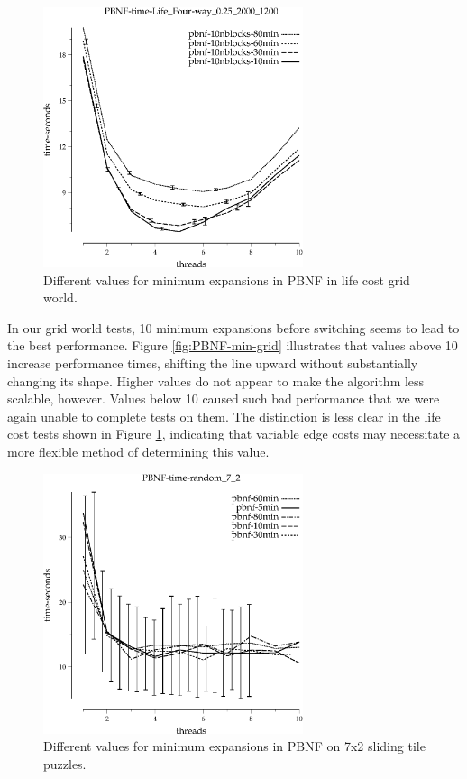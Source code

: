 \documentclass{article}
\begin{document}
\begin{figure}[h!]
\includegraphics[width=3in]{../graphs/grid_life_four-way_0.25_2000_1200/PBNF-time-Life_Four-way_0.25_2000_1200.eps}
\caption{Different values for minimum expansions in PBNF in life cost grid world.}
\label{fig:PBNF-min-life}
\end{figure}

In our grid world tests, 10 minimum expansions before switching seems to lead to the best performance. Figure \ref{fig:PBNF-min-grid} illustrates that values above 10 increase performance times, shifting the line upward without substantially changing its shape. Higher values do not appear to make the algorithm less scalable, however. Values below 10 caused such bad performance that we were again unable to complete tests on them. The distinction is less clear in the life cost tests shown in Figure \ref{fig:PBNF-min-life}, indicating that variable edge costs may necessitate a more flexible method of determining this value.

\begin{figure}[h!]
\includegraphics[width=3in]{../graphs/tiles_random_7_2/PBNF-time-random_7_2.eps}
\caption{Different values for minimum expansions in PBNF on 7x2 sliding tile puzzles.}
\label{fig:PBNF-min-tile}
\end{figure}
\end{document}
